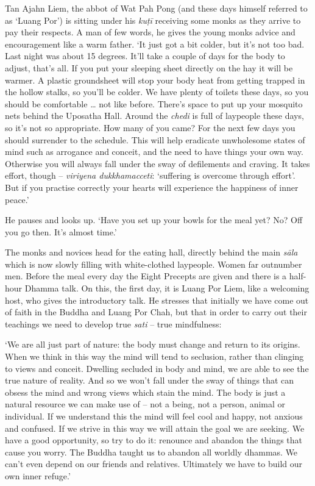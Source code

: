Tan Ajahn Liem, the abbot of Wat Pah Pong (and these days himself
referred to as `Luang Por') is sitting under his \emph{kuṭī} receiving
some monks as they arrive to pay their respects. A man of few words, he
gives the young monks advice and encouragement like a warm father. `It
just got a bit colder, but it's not too bad. Last night was about 15
degrees. It'll take a couple of days for the body to adjust, that's all. 
If you put your sleeping sheet directly on the hay it will be warmer. A
plastic groundsheet will stop your body heat from getting trapped in the
hollow stalks, so you'll be colder. We have plenty of toilets these
days, so you should be comfortable \ldots{} not like before. There's
space to put up your mosquito nets behind the Uposatha Hall. Around the
\emph{chedi} is full of laypeople these days, so it's not so
appropriate. How many of you came? For the next few days you should
surrender to the schedule. This will help eradicate unwholesome states
of mind such as arrogance and conceit, and the need to have things your
own way. Otherwise you will always fall under the sway of defilements
and craving. It takes effort, though -- \emph{viriyena dukkhamacceti}: 
`suffering is overcome through effort'. But if you practise correctly
your hearts will experience the happiness of inner peace.'

He pauses and looks up. `Have you set up your bowls for the meal yet? 
No? Off you go then. It's almost time.'

The monks and novices head for the eating hall, directly behind the main
\emph{sāla} which is now slowly filling with white-clothed laypeople. 
Women far outnumber men. Before the meal every day the Eight Precepts
are given and there is a half-hour Dhamma talk. On this, the first day, 
it is Luang Por Liem, like a welcoming host, who gives the introductory
talk. He stresses that initially we have come out of faith in the Buddha
and Luang Por Chah, but that in order to carry out their teachings we
need to develop true \emph{sati} -- true mindfulness: 

`We are all just part of nature: the body must change and return to its
origins. When we think in this way the mind will tend to seclusion, 
rather than clinging to views and conceit. Dwelling secluded in body and
mind, we are able to see the true nature of reality. And so we won't
fall under the sway of things that can obsess the mind and wrong views
which stain the mind. The body is just a natural resource we can make
use of -- not a being, not a person, animal or individual. If we
understand this the mind will feel cool and happy, not anxious and
confused. If we strive in this way we will attain the goal we are
seeking. We have a good opportunity, so try to do it: renounce and
abandon the things that cause you worry. The Buddha taught us to abandon
all worldly dhammas. We can't even depend on our friends and relatives. 
Ultimately we have to build our own inner refuge.'

